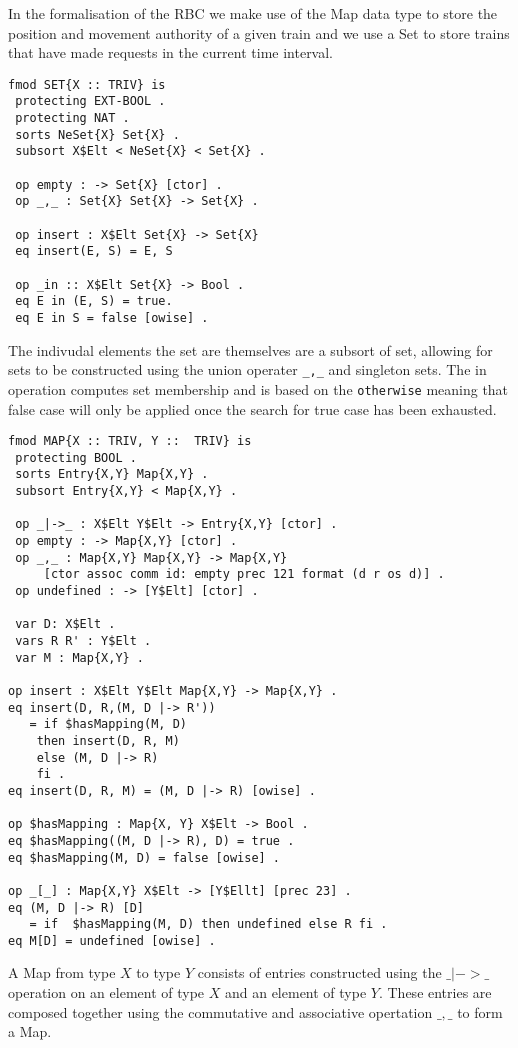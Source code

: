 In the formalisation of the RBC we make use of the Map data type to store the position and movement authority of a given train and we use a Set to store trains that have made requests in the current time interval. 

\begin{lstlisting}[caption = The specification of the Set data type in Maude]
fmod SET{X :: TRIV} is 
 protecting EXT-BOOL .
 protecting NAT .
 sorts NeSet{X} Set{X} .
 subsort X$Elt < NeSet{X} < Set{X} .

 op empty : -> Set{X} [ctor] .
 op _,_ : Set{X} Set{X} -> Set{X} .
 
 op insert : X$Elt Set{X} -> Set{X}
 eq insert(E, S) = E, S

 op _in :: X$Elt Set{X} -> Bool .
 eq E in (E, S) = true.
 eq E in S = false [owise] .

\end{lstlisting}

The indivudal elements the set are themselves are a subsort of set, allowing for sets to be constructed using the union operater \texttt{\_,\_} and singleton sets. The in operation computes set membership and is based on the \texttt{otherwise}  meaning that false case will only be applied once the search for true case has been exhausted.

\begin{lstlisting}[caption = The specification of the Map data type in Maude]
fmod MAP{X :: TRIV, Y ::  TRIV} is
 protecting BOOL .
 sorts Entry{X,Y} Map{X,Y} .
 subsort Entry{X,Y} < Map{X,Y} .

 op _|->_ : X$Elt Y$Elt -> Entry{X,Y} [ctor] .
 op empty : -> Map{X,Y} [ctor] .
 op _,_ : Map{X,Y} Map{X,Y} -> Map{X,Y} 
     [ctor assoc comm id: empty prec 121 format (d r os d)] .
 op undefined : -> [Y$Elt] [ctor] .

 var D: X$Elt .
 vars R R' : Y$Elt .
 var M : Map{X,Y} .

op insert : X$Elt Y$Elt Map{X,Y} -> Map{X,Y} .
eq insert(D, R,(M, D |-> R'))
   = if $hasMapping(M, D)
    then insert(D, R, M)
    else (M, D |-> R)
    fi .
eq insert(D, R, M) = (M, D |-> R) [owise] .

op $hasMapping : Map{X, Y} X$Elt -> Bool .
eq $hasMapping((M, D |-> R), D) = true .
eq $hasMapping(M, D) = false [owise] .

op _[_] : Map{X,Y} X$Elt -> [Y$Ellt] [prec 23] .
eq (M, D |-> R) [D]
   = if  $hasMapping(M, D) then undefined else R fi .
eq M[D] = undefined [owise] .
\end{lstlisting}
A Map from type $X$ to type $Y$ consists of entries constructed using the $\_|->\_$ operation on an element of type $X$ and an element of type $Y$. These entries are composed together using the commutative and associative opertation $\_,\_$ to form a Map.  

